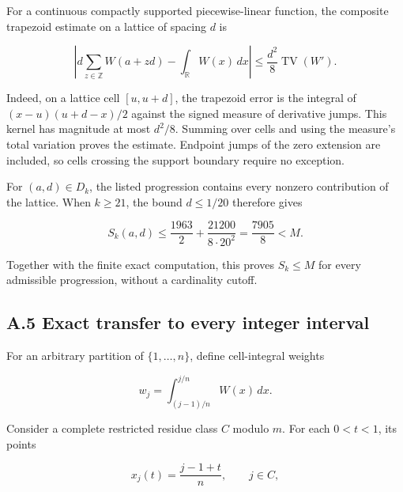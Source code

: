 \documentclass[11pt,a4paper]{article}
\begin{document}
\begin{samepage}

For a continuous compactly supported piecewise-linear function, the
composite trapezoid estimate on a lattice of spacing \(d\) is

\[
\left|d\sum_{z\in\mathbb Z}W(a+zd)-\int_{\mathbb R}W(x)\,dx\right|
\le\frac{d^2}{8}\operatorname{TV}(W').
\]

\end{samepage}

Indeed, on a lattice cell \([u,u+d]\), the trapezoid error is the
integral of \((x-u)(u+d-x)/2\) against the signed measure of derivative
jumps. This kernel has magnitude at most \(d^2/8\). Summing over cells
and using the measure's total variation proves the estimate. Endpoint
jumps of the zero extension are included, so cells crossing the support
boundary require no exception.

\begin{samepage}

For \((a,d)\in D_k\), the listed progression contains every nonzero
contribution of the lattice. When \(k\ge21\), the bound \(d\le1/20\)
therefore gives

\[
S_k(a,d)\le\frac{1963}{2}+\frac{21200}{8\cdot20^2}
=\frac{7905}{8}<M.
\]

\end{samepage}

Together with the finite exact computation, this proves \(S_k\le M\) for
every admissible progression, without a cardinality cutoff.


\hypertarget{a.5-exact-transfer-to-every-integer-interval}{%
\subsection{A.5 Exact transfer to every integer
interval}\label{a.5-exact-transfer-to-every-integer-interval}}

\begin{samepage}

For an arbitrary partition of \(\{1,\ldots,n\}\), define cell-integral
weights

\[w_j=\int_{(j-1)/n}^{j/n}W(x)\,dx.\]

\end{samepage}

\begin{samepage}

Consider a complete restricted residue class \(C\) modulo \(m\). For
each \(0<t<1\), its points

\[x_j(t)=\frac{j-1+t}{n},\qquad j\in C,\]

\end{samepage}
\end{document}
